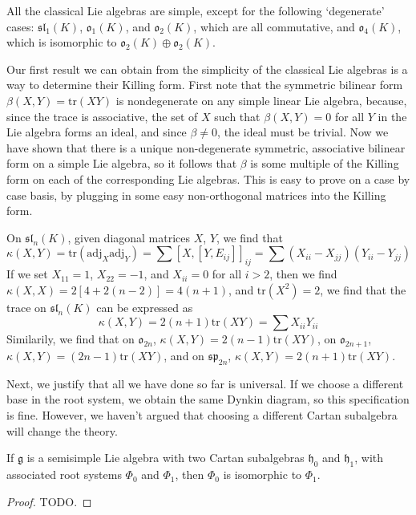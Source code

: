 \begin{corollary}
    All the classical Lie algebras are simple, except for the following `degenerate' cases: $\mathfrak{sl}_1(K)$, $\mathfrak{o}_1(K)$, and $\mathfrak{o}_2(K)$, which are all commutative, and $\mathfrak{o}_4(K)$, which is isomorphic to $\mathfrak{o}_2(K) \oplus \mathfrak{o}_2(K)$.
\end{corollary}

Our first result we can obtain from the simplicity of the classical Lie algebras is a way to determine their Killing form. First note that the symmetric bilinear form $\beta(X,Y) = \text{tr}(XY)$ is nondegenerate on any simple linear Lie algebra, because, since the trace is associative, the set of $X$ such that $\beta(X,Y) = 0$ for all $Y$ in the Lie algebra forms an ideal, and since $\beta \neq 0$, the ideal must be trivial. Now we have shown that there is a unique non-degenerate symmetric, associative bilinear form on a simple Lie algebra, so it follows that $\beta$ is some multiple of the Killing form on each of the corresponding Lie algebras. This is easy to prove on a case by case basis, by plugging in some easy non-orthogonal matrices into the Killing form.

\begin{example}
    On $\mathfrak{sl}_n(K)$, given diagonal matrices $X$, $Y$, we find that
    \[ \kappa(X, Y) = \text{tr}(\text{adj}_X \text{adj}_Y) = \sum [X,[Y,E_{ij}]]_{ij} = \sum (X_{ii} - X_{jj})(Y_{ii} - Y_{jj}) \]
    If we set $X_{11} = 1$, $X_{22} = -1$, and $X_{ii} = 0$ for all $i > 2$, then we find $\kappa(X,X) = 2[4 + 2(n-2)] = 4(n+1)$, and $\text{tr}(X^2) = 2$, we find that the trace on $\mathfrak{sl}_n(K)$ can be expressed as
    \[ \kappa(X,Y) = 2(n+1) \text{tr}(XY) = \sum X_{ii} Y_{ii} \]
    Similarily, we find that on $\mathfrak{o}_{2n}$, $\kappa(X,Y) = 2(n-1) \text{tr}(XY)$, on $\mathfrak{o}_{2n+1}$, $\kappa(X,Y) = (2n - 1) \text{tr}(XY)$, and on $\mathfrak{sp}_{2n}$, $\kappa(X,Y) = 2(n+1) \text{tr}(XY)$.
\end{example}

Next, we justify that all we have done so far is universal. If we choose a different base in the root system, we obtain the same Dynkin diagram, so this specification is fine. However, we haven't argued that choosing a different Cartan subalgebra will change the theory.

\begin{theorem}
    If $\mathfrak{g}$ is a semisimple Lie algebra with two Cartan subalgebras $\mathfrak{h}_0$ and $\mathfrak{h}_1$, with associated root systems $\Phi_0$ and $\Phi_1$, then $\Phi_0$ is isomorphic to $\Phi_1$.
\end{theorem}
\begin{proof}
    TODO.
\end{proof}

